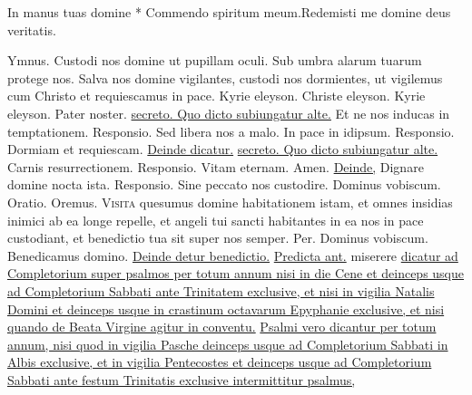 \begin{multicols*}{2}
\begin{responsory-breve}
{In manus tuas domine * Commendo spiritum meum.}{Redemisti me domine deus veritatis.}
\end{responsory-breve}
{\color{Red} Ymnus.}
\newline \V Custodi nos domine ut pupillam oculi.
\newline \R Sub umbra alarum tuarum protege nos.
 Salva nos domine vigilantes, custodi nos dormientes, ut vigilemus cum Christo et requiescamus in pace.
\newline Kyrie eleyson. Christe eleyson. Kyrie eleyson. Pater noster. \ul{secreto. Quo dicto subiungatur alte.} Et ne nos inducas in temptationem. {\color{Red} Responsio.} Sed libera nos a malo. \V In pace in idipsum. {\color{Red} Responsio.} Dormiam et requiescam. \ul{Deinde dicatur.}  \ul{secreto. Quo dicto subiungatur alte.} Carnis resurrectionem. {\color{Red} Responsio.} Vitam eternam. Amen. \ul{Deinde,} Dignare domine nocta ista. {\color{Red} Responsio.} Sine peccato nos custodire. Dominus vobiscum. {\color{Red} Oratio.} Oremus.
\lettrine[lines=2]{\zallmancaps \color{Blue} V}{isita} \hypertarget{visita-quesumus}{quesumus} domine habitationem istam, et omnes insidias inimici ab ea longe repelle, et angeli tui sancti habitantes in ea nos in pace custodiant, et benedictio tua sit super nos semper. Per. Dominus vobiscum. Benedicamus domino. \ul{Deinde detur benedictio.}
\newline \ul{Predicta ant.} miserere \ul{dicatur ad Completorium super psalmos per totum annum nisi in die Cene et deinceps usque ad Completorium Sabbati ante Trinitatem exclusive, et nisi in vigilia Natalis Domini et deinceps usque in crastinum octavarum Epyphanie exclusive, et nisi quando de Beata Virgine agitur in conventu.}
\newline \ul{Psalmi vero dicantur per totum annum, nisi quod in vigilia Pasche deinceps usque ad Completorium Sabbati in Albis exclusive, et in vigilia Pentecostes et deinceps usque ad Completorium Sabbati ante festum Trinitatis exclusive intermittitur psalmus,} 

\end{multicols*}

